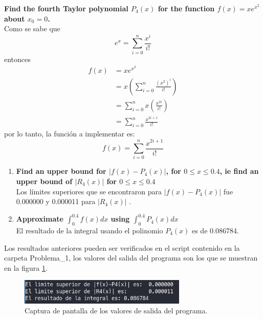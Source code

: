 \item \textbf{Find the fourth Taylor polynomial $P_4(x)$ for the function $f (x) = xe^{x^2}$ about $x_0 = 0$.}\\
Como se sabe que
\begin{equation*}
    e^x= \sum_{i=0}^n \frac{x^i}{i!}
\end{equation*}
entonces
\begin{align*}
    f(x) & =xe^{x^2}                                       \\
         & =x \left(\sum_{i=0}^n \frac{(x^2)^i}{i!}\right) \\
         & =  \sum_{i=0}^n x\left(\frac{x^{2i}}{i!}\right) \\
         & = \sum_{i=0}^n \frac{x^{2i+1}}{i!}
\end{align*}
por lo tanto, la función a implementar es:
\begin{equation*}
    f(x)= \sum_{i=0}^n \frac{x^{2i+1}}{i!}
\end{equation*}
\begin{enumerate}
    \item \textbf{Find an upper bound for $|f (x)-P_4 (x)|$, for $0 \leq x \leq 0.4$, ie find an upper bound of $|R_4 (x)|$ for $0 \leq x \leq 0.4$}\\
          Los límites superiores que se encontraron para $|f (x)-P_4 (x)|$ fue 0.000000 y 0.000011 para $|R_4 (x)|$ .
    \item \textbf{Approximate $\int_0^{0.4} f(x)dx$ using $\int_0^{0.4} P_4(x)dx$}\\
          El resultado de la integral usando el polinomio $P_4(x)$ es de 0.086784.
\end{enumerate}
Los resultados anteriores pueden ser verificados en el script contenido en la carpeta \textcolor{citecolor}{Problema\_1}, los valores del salida del programa son los que se muestran en la figura \ref{fig:problema1ss}.
\begin{figure}[H]
    \centering
    \includegraphics[width=8cm]{Graphics/problema1_ss.png}
    \caption{Captura de pantalla de los valores de salida del programa.}
    \label{fig:problema1ss}
\end{figure}